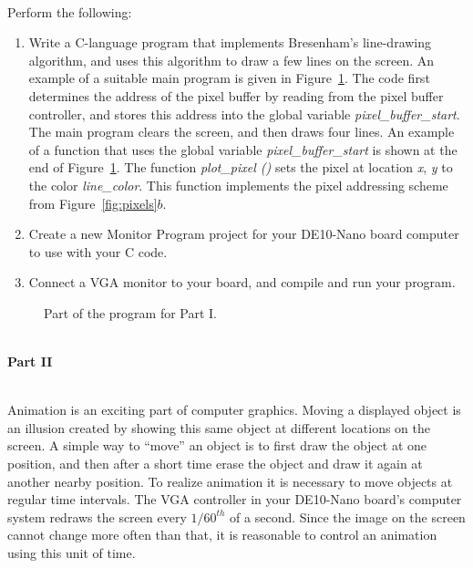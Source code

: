 \documentclass[epsfig,10pt,fullpage]{article}
\begin{document}
~\\
\noindent
Perform the following:

\begin{enumerate}

\item Write a C-language program that implements Bresenham's line-drawing algorithm,
and uses this algorithm to draw a few lines on the screen.  An example of a suitable main 
program is given in Figure~\ref{fig:main1}. The code first determines the address of the 
pixel buffer by reading from the pixel buffer controller, and stores this address into the
global variable {\it pixel\_buffer\_start}. The main program clears the screen, and then 
draws four lines.  An example of a function that uses the global variable 
{\it pixel\_buffer\_start} is shown at the end of Figure~\ref{fig:main1}. The function 
{\it plot\_pixel ()} sets the pixel at location {\it x}, {\it y} to the color {\it line\_color}. 
This function implements the pixel addressing scheme from Figure~\ref{fig:pixels}$b$.

\item Create a new Monitor Program project for your DE10-Nano board computer to use 
		  with your C code.

\item Connect a VGA monitor to your board, and compile and run your program.
\end{enumerate}

\begin{figure}[H]
\centering

\caption{Part of the program for Part I.}
\label{fig:main1}
\end{figure}

~\\
\noindent
{\bf Part II}

~\\
\noindent
Animation is an exciting part of computer graphics. Moving a displayed object is an illusion 
created by showing this same object at different locations on the screen. A simple way to
``move'' an object is to first draw the object at one position, and then after a short time erase 
the object and draw it again at another nearby position. To realize animation it is necessary 
to move objects at regular time intervals. The VGA controller in your DE10-Nano board's computer 
system redraws the screen every $1/60^{th}$ of a second. Since the image on the screen cannot 
change more often than that, it is reasonable to control an animation using this unit of time.
\end{document}
